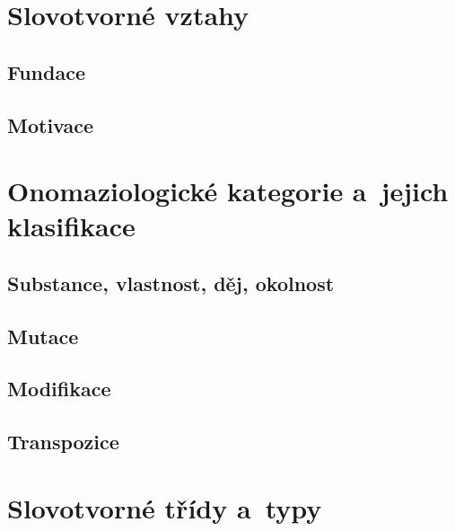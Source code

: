 \hypertarget{slovotvornuxe9-vztahy}{%
\section{Slovotvorné vztahy}\label{slovotvornuxe9-vztahy}}

\hypertarget{fundace}{%
\subsection{Fundace}\label{fundace}}

\hypertarget{motivace}{%
\subsection{Motivace}\label{motivace}}

\hypertarget{onomaziologickuxe9-kategorie-a-jejich-klasifikace}{%
\section{Onomaziologické kategorie a~jejich
klasifikace}\label{onomaziologickuxe9-kategorie-a-jejich-klasifikace}}

\hypertarget{substance-vlastnost-dux11bj-okolnost}{%
\subsection{Substance, vlastnost, děj,
okolnost}\label{substance-vlastnost-dux11bj-okolnost}}

\hypertarget{mutace}{%
\subsection{Mutace}\label{mutace}}

\hypertarget{modifikace}{%
\subsection{Modifikace}\label{modifikace}}

\hypertarget{transpozice}{%
\subsection{Transpozice}\label{transpozice}}

\hypertarget{slovotvornuxe9-tux159uxeddy-a-typy}{%
\section{Slovotvorné třídy
a~typy}\label{slovotvornuxe9-tux159uxeddy-a-typy}}

